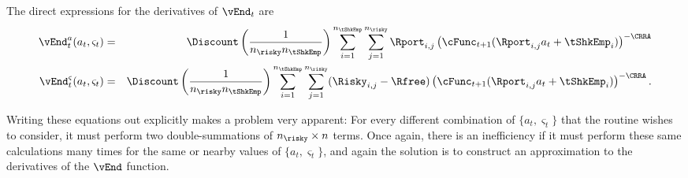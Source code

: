 \documentclass[titlepage]{\econtex}
\begin{document}
The direct expressions for the derivatives of $\vEnd_{t}$ are
\begin{eqnarray}
  \vEnd_{t}^{{a}}({a}_{t},\varsigma_{t}) & = & \Discount \left(\frac{1}{n_{\risky} n_{\tShkEmp}}\right)\sum_{i=1}^{n_{\tShkEmp}}\sum_{j=1}^{n_{\risky} }\Rport_{i,j} \left(\cFunc_{t+1}(\Rport_{i,j}{a}_{t}+\tShkEmp_{i})\right)^{-\CRRA}
  \\      \vEnd_{t}^{\varsigma}({a}_{t},\varsigma_{t}) & = & \Discount \left(\frac{1}{n_{\risky} n_{\tShkEmp}}\right)\sum_{i=1}^{n_{\tShkEmp}}\sum_{j=1}^{n_{\risky} }(\Risky_{i,j}-\Rfree)\left(\cFunc_{t+1}(\Rport_{i,j}{a}_{t}+\tShkEmp_{i})\right)^{-\CRRA}.
\end{eqnarray}

Writing these equations out explicitly makes a problem very
apparent: For every different combination of $\{{a}_{t},\varsigma_{t}\}$
that the routine wishes to consider, it must perform two
double-summations of $n_{\risky} \times n$ terms.  Once again, there is an
inefficiency if it must perform these same calculations many times
for the same or nearby values of $\{{a}_{t},\varsigma_{t}\}$, and again
the solution is to construct an approximation to the derivatives of
the $\vEnd$ function.
\end{document}
